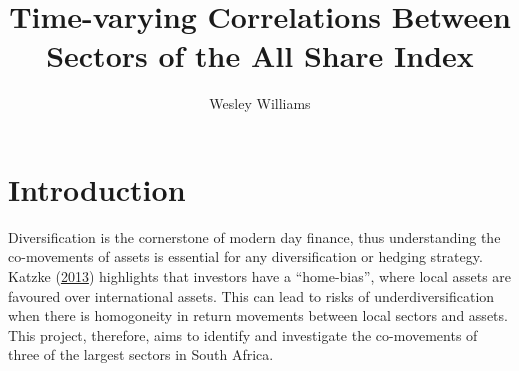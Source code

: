 \documentclass[12pt,preprint, authoryear]{elsarticle}
\numberwithin{equation}{section}
\numberwithin{figure}{section}
\numberwithin{table}{section}
\begin{document}
\begin{frontmatter}  %

\title{Time-varying Correlations Between Sectors of the All Share Index}





\author[Add1]{Wesley Williams}





\address[Add1]{Final Project for Financial Econometrics 871 at
Stellenosch University, South Africa}



\vspace{1cm}





\vspace{0.5cm}

\end{frontmatter}

\setcounter{footnote}{0}



\pagestyle{fancy}
\chead{}
\rhead{}
\lfoot{}
\lhead{}
\cfoot{}


\headsep 35pt %




\hypertarget{introduction}{%
\section{\texorpdfstring{Introduction
\label{Introduction}}{Introduction }}\label{introduction}}

Diversification is the cornerstone of modern day finance, thus
understanding the co-movements of assets is essential for any
diversification or hedging strategy. Katzke
(\protect\hyperlink{ref-katzke2013south}{2013}) highlights that
investors have a ``home-bias'', where local assets are favoured over
international assets. This can lead to risks of underdiversification
when there is homogoneity in return movements between local sectors and
assets. This project, therefore, aims to identify and investigate the
co-movements of three of the largest sectors in South Africa.
\end{document}
